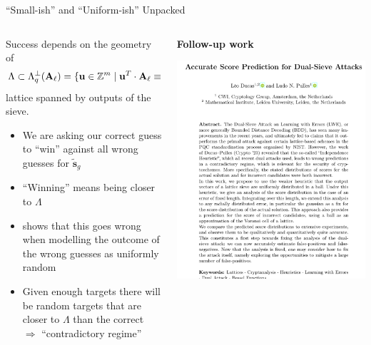\documentclass[xcolor=table,10pt,aspectratio=169]{beamer}
\renewcommand{\vec}[1]{\ensuremath{\mathbf{#1}}\xspace}
\providecommand{\mat}[1]{\ensuremath{\vec{#1}}\xspace}
\begin{document}
\begin{frame}[label={sec:org210e080}]{``Small-ish'' and ``Uniform-ish'' Unpacked}
\begin{columns}
\begin{column}{0.5\columnwidth}
Success depends on the geometry of
\[
\Lambda \subset \Lambda_{q}^{\bot}(\mat{A}_{\ell})  = \{\vec{u} \in \ZZ^{m} \mid \vec{u}^{T} \cdot \mat{A}_{\ell} \equiv \vec{0} \bmod q\},
\]
lattice spanned by outputs of the sieve.

\begin{itemize}
\item We are asking our correct guess to ``win'' against all wrong guesses for \(\tilde{\vec{s}}_{g}\)
\item ``Winning'' means being closer to \(\Lambda\)
\item \cite{EPRINT:DucPul23} shows that this goes wrong when modelling the outcome of the wrong guesses as uniformly random
\item Given enough targets there will be random targets that are closer to \(\Lambda\) than the correct \(\Rightarrow\) ``contradictory regime''
\end{itemize}
\end{column}


\begin{column}{0.5\columnwidth}
\begin{center}
\textbf{Follow-up work}
\end{center}

\begin{center}
\includegraphics[keepaspectratio,height=.75\textheight]{./ludo.png}
\end{center}
\end{column}
\end{columns}
\end{frame}
\end{document}
